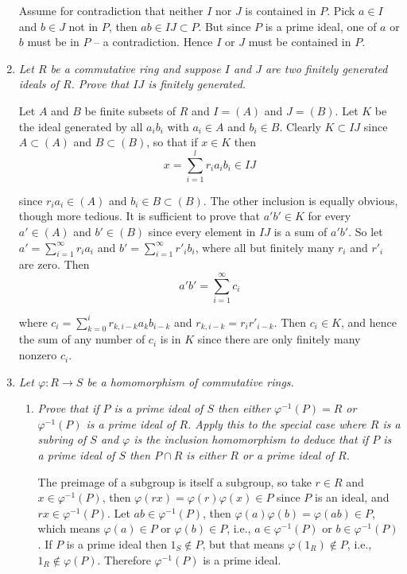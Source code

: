 \documentclass[letterpaper, 11pt]{article}
\begin{document}
\begin{enumerate}
Assume for contradiction that neither $I$ nor $J$ is contained in $P$.  Pick $a \in I$ and $b \in J$ not in $P$, then $ab \in IJ \subset P$.  But since $P$ is a prime ideal, one of $a$ or $b$ must be in $P$ -- a contradiction.  Hence $I$ or $J$ must be contained in $P$.

\item \emph{Let $R$ be a commutative ring and suppose $I$ and $J$ are two finitely generated ideals of $R$.  Prove that $IJ$ is finitely generated.}

Let $A$ and $B$ be finite subsets of $R$ and $I = (A)$ and $J = (B)$.  Let $K$ be the ideal generated by all $a_ib_i$ with $a_i \in A$ and $b_i \in B$.  Clearly $K \subset IJ$ since $A \subset (A)$ and $B \subset (B)$, so that if $x \in K$ then
\[
x = \sum_{i=1}^l r_ia_ib_i \in IJ
\]

since $r_ia_i \in (A)$ and $b_i \in B \subset (B)$.  The other inclusion is equally obvious, though more tedious.  It is sufficient to prove that $a'b' \in K$ for every $a' \in (A)$ and $b' \in (B)$ since every element in $IJ$ is a sum of $a'b'$.  So let $a' = \sum_{i=1}^\infty r_ia_i$ and $b' = \sum_{i=1}^\infty r'_ib_i$, where all but finitely many $r_i$ and $r'_i$ are zero.  Then
\[
a'b' = \sum_{i=1}^\infty c_i
\]

where $c_i = \sum_{k=0}^i r_{k,i-k} a_k b_{i-k}$ and $r_{k,i-k} = r_ir'_{i-k}$.  Then $c_i \in K$, and hence the sum of any number of $c_i$ is in $K$ since there are only finitely many nonzero $c_i$.

\item \emph{Let $\varphi: R \rightarrow S$ be a homomorphism of commutative rings.}
\begin{enumerate}
\item \emph{Prove that if $P$ is a prime ideal of $S$ then either $\varphi^{-1}(P) = R$ or $\varphi^{-1}(P)$ is a prime ideal of $R$.  Apply this to the special case where $R$ is a subring of $S$ and $\varphi$ is the inclusion homomorphism to deduce that if $P$ is a prime ideal of $S$ then $P \cap R$ is either $R$ or a prime ideal of $R$.}

The preimage of a subgroup is itself a subgroup, so take $r \in R$ and $x \in \varphi^{-1}(P)$, then $\varphi(rx) = \varphi(r)\varphi(x) \in P$ since $P$ is an ideal, and $rx \in \varphi^{-1}(P)$.  Let $ab \in \varphi^{-1}(P)$, then $\varphi(a)\varphi(b) = \varphi(ab) \in P$, which means $\varphi(a) \in P$ or $\varphi(b) \in P$, i.e., $a \in \varphi^{-1}(P)$ or $b \in \varphi^{-1}(P)$.  If $P$ is a prime ideal then $1_S \notin P$, but that means $\varphi(1_R) \notin P$, i.e., $1_R \notin \varphi(P)$.  Therefore $\varphi^{-1}(P)$ is a prime ideal.


\end{enumerate}
\end{enumerate}
\end{document}

